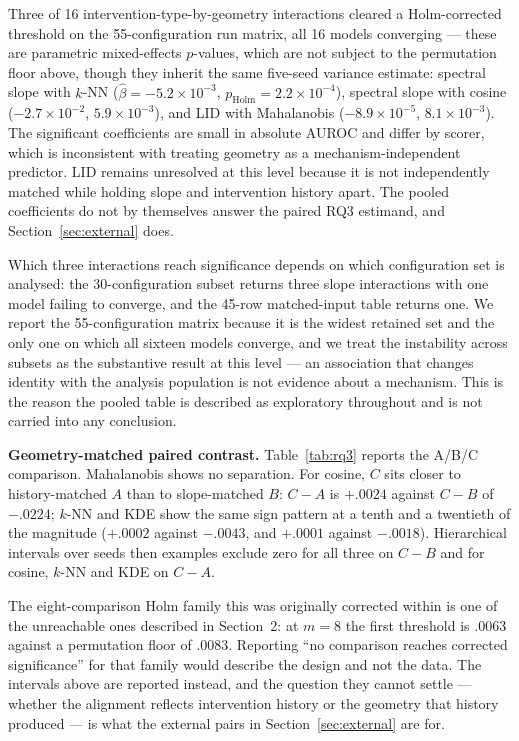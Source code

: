 \documentclass[pdflatex,sn-basic]{sn-jnl}
\theoremstyle{plain}
\theoremstyle{definition}
\theoremstyle{remark}
\begin{document}
Three of 16 intervention-type-by-geometry interactions cleared a Holm-corrected threshold on the 55-configuration run matrix, all 16 models converging --- these are parametric mixed-effects $p$-values, which are not subject to the permutation floor above, though they inherit the same five-seed variance estimate: spectral slope with $k$-NN ($\hat\beta=-5.2\times10^{-3}$, $p_{\mathrm{Holm}}=2.2\times10^{-4}$), spectral slope with cosine ($-2.7\times10^{-2}$, $5.9\times10^{-3}$), and LID with Mahalanobis ($-8.9\times10^{-5}$, $8.1\times10^{-3}$). The significant coefficients are small in absolute AUROC and differ by scorer, which is inconsistent with treating geometry as a mechanism-independent predictor. LID remains unresolved at this level because it is not independently matched while holding slope and intervention history apart. The pooled coefficients do not by themselves answer the paired RQ3 estimand, and Section~\ref{sec:external} does.

Which three interactions reach significance depends on which configuration set is analysed: the 30-configuration subset returns three slope interactions with one model failing to converge, and the 45-row matched-input table returns one. We report the 55-configuration matrix because it is the widest retained set and the only one on which all sixteen models converge, and we treat the instability across subsets as the substantive result at this level --- an association that changes identity with the analysis population is not evidence about a mechanism. This is the reason the pooled table is described as exploratory throughout and is not carried into any conclusion.

\textbf{Geometry-matched paired contrast.} Table~\ref{tab:rq3} reports the A/B/C comparison. Mahalanobis shows no separation. For cosine, $C$ sits closer to history-matched $A$ than to slope-matched $B$: $C-A$ is $+.0024$ against $C-B$ of $-.0224$; $k$-NN and KDE show the same sign pattern at a tenth and a twentieth of the magnitude ($+.0002$ against $-.0043$, and $+.0001$ against $-.0018$). Hierarchical intervals over seeds then examples exclude zero for all three on $C-B$ and for cosine, $k$-NN and KDE on $C-A$.

The eight-comparison Holm family this was originally corrected within is one of the unreachable ones described in Section~2: at $m=8$ the first threshold is $.0063$ against a permutation floor of $.0083$. Reporting ``no comparison reaches corrected significance'' for that family would describe the design and not the data. The intervals above are reported instead, and the question they cannot settle --- whether the alignment reflects intervention history or the geometry that history produced --- is what the external pairs in Section~\ref{sec:external} are for.
\end{document}
